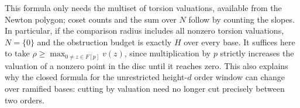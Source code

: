 This formula only needs the multiset of torsion valuations, available
from the Newton polygon; coset counts and the sum over $N$ follow by
counting the slopes. In particular, if the comparison radius includes
all nonzero torsion valuations, $N=\{0\}$ and the obstruction budget
is exactly $H$ over every base. It suffices here to take
$\rho\ge\max_{0\ne z\in F[p]}v(z)$, since multiplication by $p$ strictly
increases the valuation of a nonzero point in the disc until it reaches
zero. This also explains why the closed formula for the unrestricted
height-$d$ order window can change over ramified bases: cutting by
valuation need no longer cut precisely between two orders.
